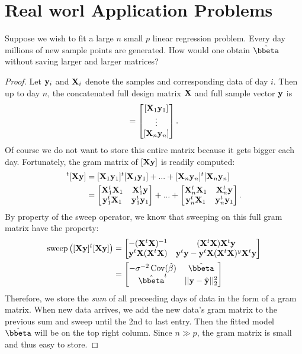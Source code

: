 \section{Real worl Application Problems}

\begin{problembox}{}{}
Suppose we wish to fit a large $n$ small $p$ linear regression problem. Every day millions of new sample points are generated. How would one obtain $\hat{\bbeta}$ without saving larger and larger matrices?
\end{problembox}

\begin{proof}
Let $\mathbf{y}_i$ and $\mathbf{X}_i$ denote the samples and corresponding data of day $i$. Then up to day $n$, the concatenated full design matrix $\mathbf{X}$ and full sample vector $\mathbf{y}$ is 
\begin{align*}
	[\bX \by ] = 
	\begin{bmatrix}
		[\bX_1 \by_1] \\
		\vdots \\
		[\bX_n \by_n]
	\end{bmatrix}.
\end{align*}
Of course we do not want to store this entire matrix because it gets bigger each day. Fortunately, the gram matrix of $[\mathbf{X} \mathbf{y} ]$ is readily computed:
\begin{align*}
	[\bX \by ]^t[\bX \by ] 
	&= [\bX_1\by_1]^t[\bX_1\by_1] + ... + [\bX_n\by_n]^t[\bX_n\by_n]\\
	&= 
	\begin{bmatrix}
		\bX_1^t\bX_1 & \bX_1^t \by\\
		\by_1^t\bX_1 & \by_1^t \by_1
	\end{bmatrix}
	+ ... + 
	\begin{bmatrix}
		\bX_n^t\bX_1 & \bX_n^t \by\\
		\by_n^t\bX_1 & \by_n^t \by_1
	\end{bmatrix}.
\end{align*}
By property of the sweep operator, we know that sweeping on this full gram matrix have the property:
\begin{align*}
	\text{sweep}\left([\bX \by ]^t[\bX \by ]\right)
	&= 
	\begin{bmatrix}
		- (\bX^t \bX)^{-1} & (\bX^t \bX)\bX^t \by\\
		\by^t\bX(\bX^t \bX) & \by^t \by - \by^t\bX(\bX^t \bX)^y\bX^t\by
	\end{bmatrix}\\
	&= 
	\begin{bmatrix}
		-\sigma^{-2}\Cov(\hat{\beta}) & \hat{\bbeta}\\
		\hat{\bbeta}^t & ||\by - \hat{\by}||_2^2
	\end{bmatrix}
\end{align*}
Therefore, we store the \textit{sum} of all preceeding days of data in the form of a gram matrix. When new data arrives, we add the new data's gram matrix to the previous sum and sweep until the 2nd to last entry. Then the fitted model $\hat{\bbeta}$ will be on the top right column. Since $n \gg p$, the gram matrix is small and thus easy to store. 
\end{proof}


